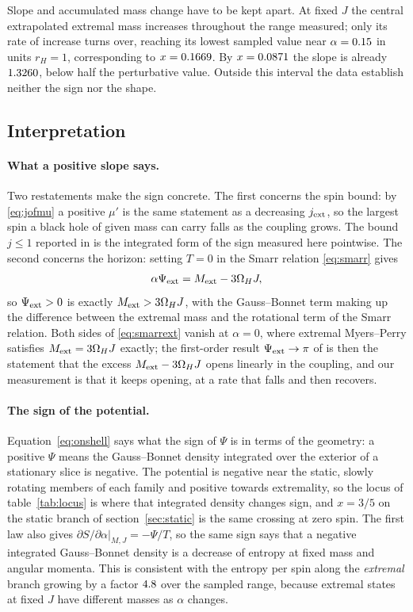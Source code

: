 \documentclass[11pt,a4paper]{article}
\begin{document}
Slope and accumulated mass change have to be kept apart. At fixed $J$ the
central extrapolated extremal mass increases throughout the range measured;
only its rate of increase turns over, reaching its lowest sampled value near
$\alpha=0.15$ in units $r_H=1$, corresponding to $x=0.1669$. By
$x=0.0871$ the slope is already $1.3260$, below half the perturbative
value. Outside this interval the data establish neither the sign nor the shape.

\subsection{Interpretation}
\label{sec:interpretation}

\paragraph{What a positive slope says.}
Two restatements make the sign concrete. The first concerns the spin bound:
by \eqref{eq:jofmu} a positive $\mu'$ is the same statement as a decreasing
$j_{\mathrm{ext}}$, so the largest spin a black hole of given mass can carry falls as the
coupling grows. The bound $j\le1$ reported in \cite{Kleihaus:2023zzs} is the
integrated form of the sign measured here pointwise. The second concerns the
horizon: setting $T=0$ in the Smarr relation \eqref{eq:smarr} gives
\begin{equation}
 \alpha\Psi_{\mathrm{ext}}=M_{\mathrm{ext}}-3\Omega_HJ ,
 \label{eq:smarrext}
\end{equation}
so $\Psi_{\mathrm{ext}}>0$ is exactly $M_{\mathrm{ext}}>3\Omega_HJ$, with the Gauss--Bonnet term
making up the difference between the extremal mass and the rotational term of
the Smarr relation. Both sides of \eqref{eq:smarrext} vanish at $\alpha=0$,
where extremal Myers--Perry satisfies $M_{\mathrm{ext}}=3\Omega_HJ$ exactly; the
first-order result $\Psi_{\mathrm{ext}}\to\pi$ of \cite{Ma:2020xwi} is then the statement
that the excess $M_{\mathrm{ext}}-3\Omega_HJ$ opens linearly in the coupling, and our
measurement is that it keeps opening, at a rate that falls and then recovers.

\paragraph{The sign of the potential.}
Equation~\eqref{eq:onshell} says what the sign of $\Psi$ is in terms of the
geometry: a positive $\Psi$ means the Gauss--Bonnet density integrated over the
exterior of a stationary slice is negative. The potential is negative near the
static, slowly rotating members of each family and positive towards
extremality, so the locus of table~\ref{tab:locus} is where that integrated
density changes sign, and $x=3/5$ on the static branch of
section~\ref{sec:static} is the same crossing at zero spin. The first law also
gives $\partial S/\partial\alpha|_{M,J}=-\Psi/T$, so the same sign says that a
negative integrated Gauss--Bonnet density is a decrease of entropy at fixed
mass and angular momenta. This is consistent with the entropy per spin along
the \emph{extremal} branch growing by a factor $4.8$ over the sampled
range, because extremal states at fixed $J$ have different masses as $\alpha$
changes.
\end{document}

